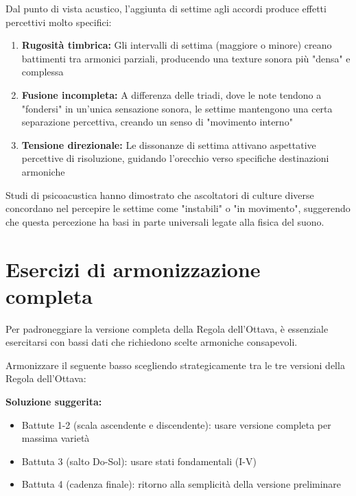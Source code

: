 \begin{fisica}
	Dal punto di vista acustico, l'aggiunta di settime agli accordi produce effetti percettivi molto specifici:
	
	\begin{enumerate}
		\item \textbf{Rugosità timbrica:} Gli intervalli di settima (maggiore o minore) creano battimenti tra armonici parziali, producendo una texture sonora più "densa" e complessa
		
		\item \textbf{Fusione incompleta:} A differenza delle triadi, dove le note tendono a "fondersi" in un'unica sensazione sonora, le settime mantengono una certa separazione percettiva, creando un senso di "movimento interno"
		
		\item \textbf{Tensione direzionale:} Le dissonanze di settima attivano aspettative percettive di risoluzione, guidando l'orecchio verso specifiche destinazioni armoniche
	\end{enumerate}
	
	Studi di psicoacustica hanno dimostrato che ascoltatori di culture diverse concordano nel percepire le settime come "instabili" o "in movimento", suggerendo che questa percezione ha basi in parte universali legate alla fisica del suono.
\end{fisica}

\section{Esercizi di armonizzazione completa}
\label{sec:esercizi_armonizzazione}

Per padroneggiare la versione completa della Regola dell'Ottava, è essenziale esercitarsi con bassi dati che richiedono scelte armoniche consapevoli.

\begin{esempio}
	\label{ex:basso_dato_misto}
	
	Armonizzare il seguente basso scegliendo strategicamente tra le tre versioni della Regola dell'Ottava:
	
	
	\textbf{Soluzione suggerita:}
	\begin{itemize}
		\item Battute 1-2 (scala ascendente e discendente): usare versione completa per massima varietà
		\item Battuta 3 (salto Do-Sol): usare stati fondamentali (I-V)
		\item Battuta 4 (cadenza finale): ritorno alla semplicità della versione preliminare
	\end{itemize}
\end{esempio}

